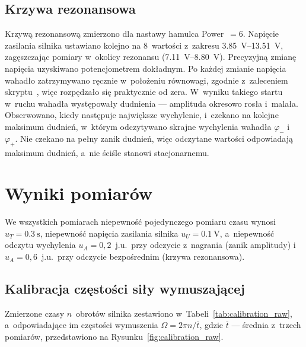 \documentclass[12pt, a4paper]{article}
\begin{document}
\subsection{Krzywa rezonansowa}\label{sec:proc_resonance}

Krzywą rezonansową zmierzono dla nastawy hamulca Power~$=6$. Napięcie zasilania
silnika ustawiano kolejno na $8$~wartości z~zakresu \SIrange{3.85}{13.51}{\volt},
zagęszczając pomiary w~okolicy rezonansu (\SIrange{7.11}{8.80}{\volt}).
Precyzyjną zmianę napięcia uzyskiwano potencjometrem dokładnym. Po każdej zmianie
napięcia wahadło zatrzymywano ręcznie w~położeniu równowagi, zgodnie z~zaleceniem
skryptu~\cite{skrypt}, więc rozpędzało się praktycznie od zera. W~wyniku takiego startu
w~ruchu wahadła występowały dudnienia --- amplituda okresowo rosła i~malała.
Obserwowano, kiedy następuje największe wychylenie, i~czekano na kolejne maksimum
dudnień, w~którym odczytywano skrajne wychylenia wahadła $\varphi_-$ i~$\varphi_+$.
Nie czekano na pełny zanik dudnień, więc odczytane wartości odpowiadają maksimum
dudnień, a~nie ściśle stanowi stacjonarnemu.



\section{Wyniki pomiarów}

We wszystkich pomiarach niepewność pojedynczego pomiaru czasu wynosi
$u_T = \SI{0.3}{\second}$, niepewność napięcia zasilania silnika $u_U = \SI{0.1}{\volt}$,
a~niepewność odczytu wychylenia $u_A = 0{,}2$~j.u.\ przy odczycie z~nagrania
(zanik amplitudy) i~$u_A = 0{,}6$~j.u.\ przy odczycie bezpośrednim (krzywa rezonansowa).

\subsection{Kalibracja częstości siły wymuszającej}\label{sec:res_calibration}

Zmierzone czasy $n$~obrotów silnika zestawiono w~Tabeli~\ref{tab:calibration_raw},
a~odpowiadające im częstości wymuszenia $\Omega = 2\pi n/\overline{t}$, gdzie
$\overline{t}$ --- średnia z~trzech pomiarów, przedstawiono na
Rysunku~\ref{fig:calibration_raw}.
\end{document}
